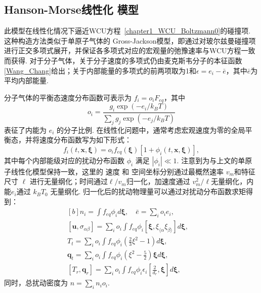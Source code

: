 \subsection{Hanson-Morse线性化 模型} 

此模型在线性化情况下逼近WCU方程~\eqref{chapter1_WCU_Boltzmann0}的碰撞项. 这种构造方法类似于单原子气体的 Gross-Jackson模型\cite{GrossJackson1959}，即通过对玻尔兹曼碰撞项进行正交多项式展开，并保证各多项式对应的宏观量的弛豫速率与WCU方程一致而获得. 对于分子气体，关于分子速度的多项式仍由麦克斯韦分子的本征函数\eqref{Wang_Chang}给出；关于内部能量的多项式的前两项取为1和$\epsilon=e_i-\bar{e}$，其中$\bar{e}$为平均内部能量\cite{WangCS}. 


分子气体的平衡态速度分布函数可表示为 $f_i=o_iF_{eq}$，其中
\begin{equation}
o_i=\frac{g_i\exp(-e_i/k_BT)}{\sum_j{}g_j\exp(-e_j/k_BT)}
\end{equation}
表征了内能为 $e_i$ 的分子比例. 在线性化问题中，通常考虑宏观速度为零的全局平衡态，并将速度分布函数写为如下形式：
\begin{equation}\label{polyatomic_lin_origin}
f_i(t,\bm{x},\bm{\xi})=o_if_{eq}(\bm{\xi})\left[1+\phi_i(t,\bm{x},\bm{\xi})\right],
\end{equation}
其中每个内部能级对应的扰动分布函数 $\phi_i$ 满足 $|\phi_i|\ll1$. 注意到为与上文的单原子线性化模型保持一致，这里的 速度 和 空间坐标分别通过最概然速率 $v_m$和特征尺寸 $\ell$ 进行无量纲化；时间通过$\ell/v_m$归一化，加速度通过 $v_m^2/\ell$无量纲化，内能$e_i$通过 $k_BT_0$ 无量纲化. 归一化后的扰动物理量可以通过对扰动分布函数求矩得到：
\begin{equation}
\begin{aligned}[b]
{n}_i=\int{f_{eq}}\phi_id\bm{\xi}, \quad
\bar{e} =\sum_io_ie_i,\\
[\bm{u},\sigma_{\alpha\beta}]=\sum_io_i\int{f_{eq}}\phi_i[\bm{\xi},\xi_{\langle \alpha}\xi_{\beta\rangle}]d\bm{\xi}, 
\quad\\
T_{t}=\sum_io_i\int{f_{eq}}\phi_i
\left(\frac{2}{3}\xi^2-1\right)d\bm{\xi}, \\
\bm{q}_{t}=\sum_io_i\int{f_{eq}}\phi_i
\left(\xi^2-\frac{5}{2}\right)\bm{\xi}d\bm{\xi}, \\
[T_{r},\bm{q}_{r}]=\sum_io_i\int{f_{eq}}\phi_i\epsilon_i
\left[\frac{2}{d_r},\bm{\xi}\right]d\bm{\xi}, 
\end{aligned}
\end{equation}
同时，总扰动密度为 ${n}=\sum_i{n}_io_i$.

